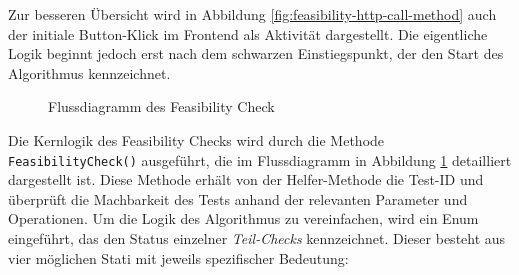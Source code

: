 Zur besseren Übersicht wird in Abbildung \ref{fig:feasibility-http-call-method} auch der initiale Button-Klick im Frontend als Aktivität dargestellt. Die eigentliche Logik beginnt jedoch erst nach dem schwarzen Einstiegspunkt, der den Start des Algorithmus kennzeichnet.

\begin{figure}[!htbp]
    \centering
    \caption{Flussdiagramm des Feasibility Check}
    \label{fig:feasibility-check}
\end{figure}

Die Kernlogik des Feasibility Checks wird durch die Methode \texttt{FeasibilityCheck()} ausgeführt, die im Flussdiagramm in Abbildung \ref{fig:feasibility-check} detailliert dargestellt ist. Diese Methode erhält von der Helfer-Methode die Test-ID und überprüft die Machbarkeit des Tests anhand der relevanten Parameter und Operationen. Um die Logik des Algorithmus zu vereinfachen, wird ein Enum eingeführt, das den Status einzelner \textit{Teil-Checks} kennzeichnet. Dieser besteht aus vier möglichen Stati mit jeweils spezifischer Bedeutung:

